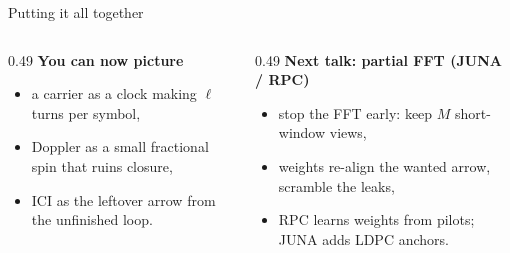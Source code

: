 \documentclass[aspectratio=169,10pt]{beamer}
\begin{document}
\begin{frame}{Putting it all together}
\vspace{0.08cm}
\begin{center}
\end{center}

\vspace{0.08cm}
{\scriptsize
\begin{columns}[T,onlytextwidth]
  \begin{column}{0.49\textwidth}
    \textbf{You can now picture}
    \begin{itemize}\setlength{\itemsep}{-0.10em}
      \item a carrier as a clock making $\ell$ turns per symbol,
      \item Doppler as a small fractional spin that ruins closure,
      \item ICI as the leftover arrow from the unfinished loop.
    \end{itemize}
  \end{column}
  \begin{column}{0.49\textwidth}
    \textbf{Next talk: partial FFT (JUNA / RPC)}
    \begin{itemize}\setlength{\itemsep}{-0.10em}
      \item stop the FFT early: keep $M$ short-window views,
      \item weights re-align the wanted arrow, scramble the leaks,
      \item RPC learns weights from pilots; JUNA adds LDPC anchors.
    \end{itemize}
  \end{column}
\end{columns}}

\end{frame}
\end{document}
